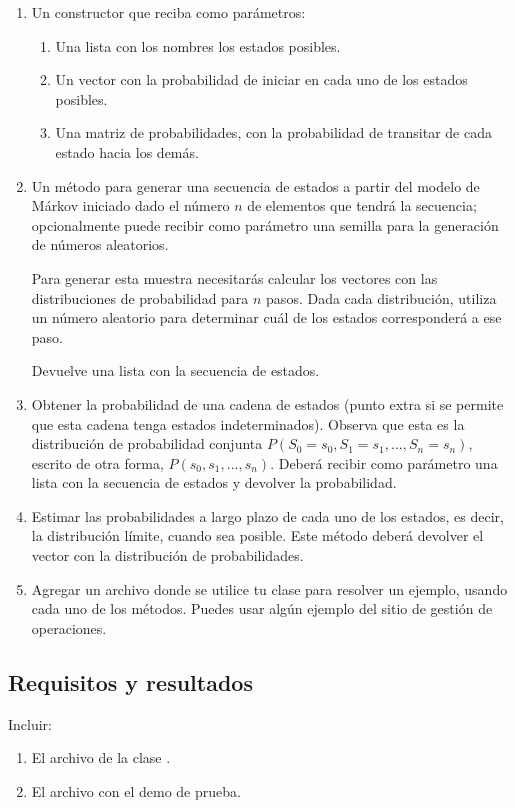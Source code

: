 \begin{enumerate}
 \item Un constructor que reciba como parámetros:
 \begin{enumerate}
  \item Una lista con los nombres los estados posibles.
  \item Un vector con la probabilidad de iniciar en cada uno de los estados posibles.
  \item Una matriz de probabilidades, con la probabilidad de transitar de cada estado hacia los demás.
 \end{enumerate}

 \item Un método para generar una secuencia de estados a partir del modelo de Márkov iniciado dado el número $n$ de elementos que tendrá la secuencia; opcionalmente puede recibir como parámetro una semilla para la generación de números aleatorios.
 
 Para generar esta muestra necesitarás calcular los vectores con las distribuciones de probabilidad para $n$ pasos.  Dada cada distribución, utiliza un número aleatorio para determinar cuál de los estados corresponderá a ese paso.
 
 Devuelve una lista con la secuencia de estados.
 
 \item Obtener la probabilidad de una cadena de estados (punto extra si se permite que esta cadena tenga estados indeterminados).  Observa que esta es la distribución de probabilidad conjunta $P(S_0=s_0,S_1=s_1,...,S_n=s_n)$, escrito de otra forma, $P(s_0,s_1,...,s_n)$.  Deberá recibir como parámetro una lista con la secuencia de estados y devolver la probabilidad.
 
 \item Estimar las probabilidades a largo plazo de cada uno de los estados, es decir, la distribución límite, cuando sea posible.  Este método deberá devolver el vector con la distribución de probabilidades.
 
 \item Agregar un archivo donde se utilice tu clase para resolver un ejemplo, usando cada uno de los métodos.  Puedes usar algún ejemplo del sitio de gestión de operaciones.
\end{enumerate}


\subsection{Requisitos y resultados}

Incluir:

\begin{enumerate}
 \item El archivo de la clase .
 \item El archivo con el demo de prueba.
\end{enumerate}

